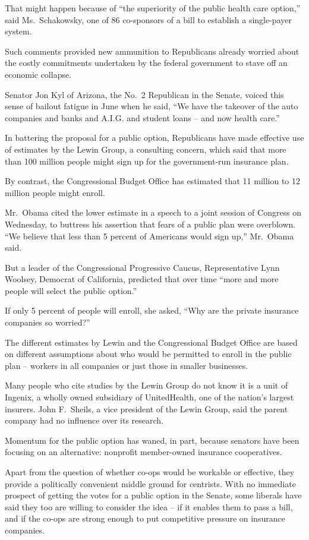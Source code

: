 ﻿\documentclass[12pt]{article}
\begin{document}
That might happen because of ``the superiority of the public health care option,'' said
Ms.~Schakowsky, one of 86 co-sponsors of a bill to establish a single-payer system.

Such comments provided new ammunition to Republicans already worried about the costly commitments
undertaken by the federal government to stave off an economic collapse.

Senator Jon Kyl of Arizona, the No.~2 Republican in the Senate, voiced this sense of bailout fatigue
in June when he said, ``We have the takeover of the auto companies and banks and A.I.G. and student
loans -- and now health care.''

In battering the proposal for a public option, Republicans have made effective use of estimates by
the Lewin Group, a consulting concern, which said that more than 100 million people might sign up
for the government-run insurance plan.

By contrast, the Congressional Budget Office has estimated that 11 million to 12 million people
might enroll.

Mr.~Obama cited the lower estimate in a speech to a joint session of Congress on Wednesday, to
buttress\cite{buttress} his assertion that fears of a public plan were overblown. ``We believe that
less than 5 percent of Americans would sign up,'' Mr.~Obama said.

But a leader of the Congressional Progressive Caucus, Representative Lynn Woolsey, Democrat of
California, predicted that over time ``more and more people will select the public option.''

If only 5 percent of people will enroll, she asked, ``Why are the private insurance companies so
worried?''

The different estimates by Lewin and the Congressional Budget Office are based on different
assumptions about who would be permitted to enroll in the public plan -- workers in all companies or
just those in smaller businesses.

Many people who cite studies by the Lewin Group do not know it is a unit of Ingenix, a wholly owned
subsidiary of UnitedHealth, one of the nation's largest insurers. John F.~Sheils, a vice president
of the Lewin Group, said the parent company had no influence over its research.

Momentum for the public option has waned, in part, because senators have been focusing on an
alternative: nonprofit member-owned insurance cooperatives.

Apart from the question of whether co-ops would be workable or effective, they provide a politically
convenient middle ground for centrists. With no immediate prospect of getting the votes for a public
option in the Senate, some liberals have said they too are willing to consider the idea -- if it
enables them to pass a bill, and if the co-ops are strong enough to put competitive pressure on
insurance companies.
\end{document}
